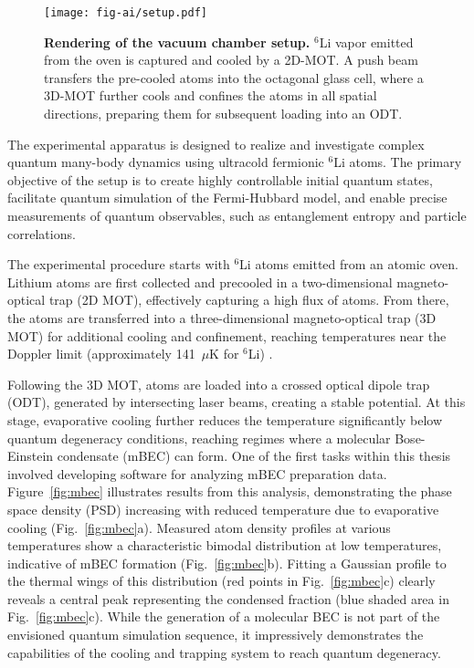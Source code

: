 

\begin{figure}
    \centering
    \texttt{[image: fig-ai/setup.pdf]} 
    \caption[Rendering of the vacuum chamber setup]{
    \textbf{Rendering of the vacuum chamber setup.} 
    $^6$Li vapor emitted from the oven is captured and cooled by a 2D-MOT. A push beam transfers the pre-cooled atoms into the octagonal glass cell, where a 3D-MOT further cools and confines the atoms in all spatial directions, preparing them for subsequent loading into an ODT.
    }
    \label{fig:setup}
\end{figure}



The experimental apparatus is designed to realize and investigate complex quantum many-body dynamics using ultracold fermionic $^6$Li atoms. The primary objective of the setup is to create highly controllable initial quantum states, facilitate quantum simulation of the Fermi-Hubbard model, and enable precise measurements of quantum observables, such as entanglement entropy and particle correlations.

The experimental procedure starts with $^6$Li atoms emitted from an atomic oven. Lithium atoms are first collected and precooled in a two-dimensional magneto-optical trap (2D MOT), effectively capturing a high flux of atoms. From there, the atoms are transferred into a three-dimensional magneto-optical trap (3D MOT) for additional cooling and confinement, reaching temperatures near the Doppler limit (approximately 141~$\mu$K for $^6$Li) \cite{culemann_construction_2024, huang_construction_2024}.

Following the 3D MOT, atoms are loaded into a crossed optical dipole trap (ODT), generated by intersecting laser beams, creating a stable potential. At this stage, evaporative cooling further reduces the temperature significantly below quantum degeneracy conditions, reaching regimes where a molecular Bose-Einstein condensate (mBEC) can form. One of the first tasks within this thesis involved developing software for analyzing mBEC preparation data. Figure~\ref{fig:mbec} illustrates results from this analysis, demonstrating the phase space density (PSD) increasing with reduced temperature due to evaporative cooling (Fig.~\ref{fig:mbec}a). Measured atom density profiles at various temperatures show a characteristic bimodal distribution at low temperatures, indicative of mBEC formation (Fig.~\ref{fig:mbec}b). Fitting a Gaussian profile to the thermal wings of this distribution (red points in Fig.~\ref{fig:mbec}c) clearly reveals a central peak representing the condensed fraction (blue shaded area in Fig.~\ref{fig:mbec}c). While the generation of a molecular BEC is not part of the envisioned quantum simulation sequence, it impressively demonstrates the capabilities of the cooling and trapping system to reach quantum degeneracy.


